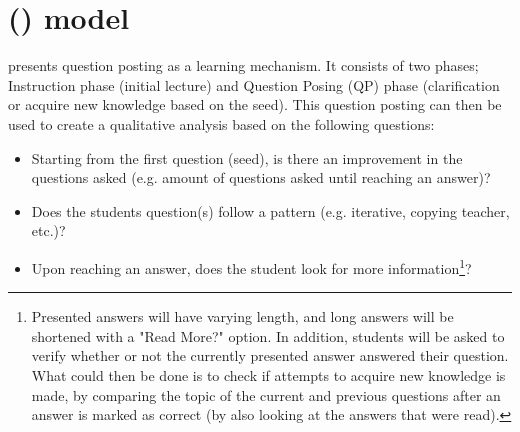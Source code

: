 \section{ () model}
\label{chapter4:qa_model}
\citet{Mishra2015} presents question posting as a learning mechanism. It consists of two phases; Instruction phase (initial lecture) and Question Posing (QP) phase 
(clarification or acquire new knowledge based on the seed). This question posting can then be used to create a qualitative analysis based on the following questions:
\begin{itemize}
	\item Starting from the first question (seed), is there an improvement in the questions asked 
	(e.g. amount of questions asked until reaching an answer)?
	\item Does the students question(s) follow a pattern (e.g. iterative, copying teacher, etc.)?
	\item Upon reaching an answer, does the student look for more information\footnote{
		Presented answers will have varying length, and long answers will be shortened with a "Read More?" option.
		In addition, students will be asked to verify whether or not the currently presented answer answered their question.
		What could then be done is to check if attempts to acquire new knowledge is made, by comparing the topic of the current 
		and previous questions after an answer is marked as correct (by also looking at the answers that were read).
		}?
\end{itemize}

